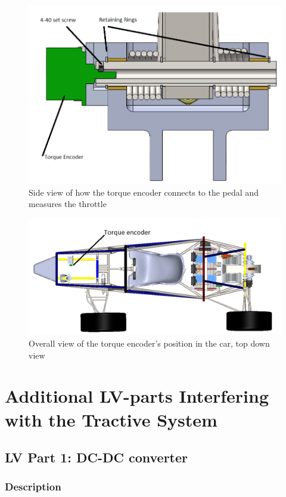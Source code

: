 \documentclass{article}
\begin{document}
        \begin{figure}[H]
            \centering
            \includegraphics[width = 0.7 \textwidth]{torqueside}
            \caption{Side view of how the torque encoder connects to the pedal and measures the throttle}
            \label{torqside}
        \end{figure}

        \begin{figure}[H]
            \centering
            \includegraphics[width = 0.7 \textwidth]{torquefullcar}
            \caption{Overall view of the torque encoder's position in the car, top down view}
            \label{torquetopdown}
        \end{figure}

\newpage

\section{Additional LV-parts Interfering with the Tractive System}

    \subsection{LV Part 1: DC-DC converter}

        \subsubsection{Description}
\end{document}
